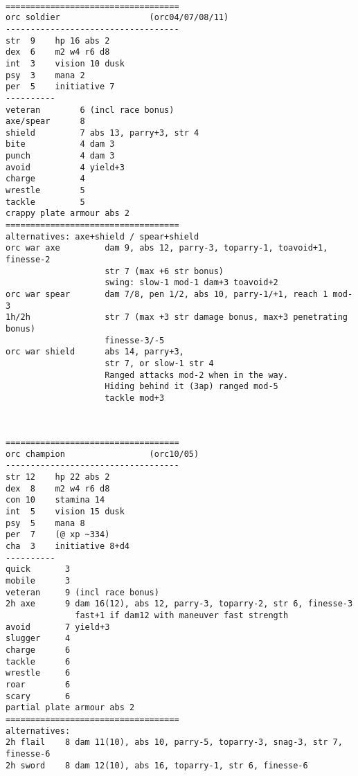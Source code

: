 \

\goodbreak \begin{samepage} \small \begin{verbatim}
===================================
orc soldier                  (orc04/07/08/11)
-----------------------------------
str  9    hp 16 abs 2
dex  6    m2 w4 r6 d8
int  3    vision 10 dusk
psy  3    mana 2
per  5    initiative 7
----------
veteran        6 (incl race bonus)
axe/spear      8
shield         7 abs 13, parry+3, str 4
bite           4 dam 3
punch          4 dam 3
avoid          4 yield+3
charge         4
wrestle        5
tackle         5
crappy plate armour abs 2
===================================
alternatives: axe+shield / spear+shield
orc war axe         dam 9, abs 12, parry-3, toparry-1, toavoid+1, finesse-2
                    str 7 (max +6 str bonus)
                    swing: slow-1 mod-1 dam+3 toavoid+2
orc war spear       dam 7/8, pen 1/2, abs 10, parry-1/+1, reach 1 mod-3
1h/2h               str 7 (max +3 str damage bonus, max+3 penetrating bonus)
                    finesse-3/-5
orc war shield      abs 14, parry+3,
                    str 7, or slow-1 str 4
                    Ranged attacks mod-2 when in the way.
                    Hiding behind it (3ap) ranged mod-5
                    tackle mod+3
\end{verbatim} \normalsize \end{samepage}

\

\goodbreak \begin{samepage} \small \begin{verbatim}
===================================
orc champion                 (orc10/05)
-----------------------------------
str 12    hp 22 abs 2
dex  8    m2 w4 r6 d8
con 10    stamina 14
int  5    vision 15 dusk
psy  5    mana 8
per  7    (@ xp ~334)
cha  3    initiative 8+d4
----------
quick       3
mobile      3
veteran     9 (incl race bonus)
2h axe      9 dam 16(12), abs 12, parry-3, toparry-2, str 6, finesse-3
              fast+1 if dam12 with maneuver fast strength
avoid       7 yield+3
slugger     4
charge      6
tackle      6
wrestle     6
roar        6
scary       6
partial plate armour abs 2
===================================
alternatives:
2h flail    8 dam 11(10), abs 10, parry-5, toparry-3, snag-3, str 7, finesse-6
2h sword    8 dam 12(10), abs 16, toparry-1, str 6, finesse-6
\end{verbatim} \normalsize \end{samepage}

